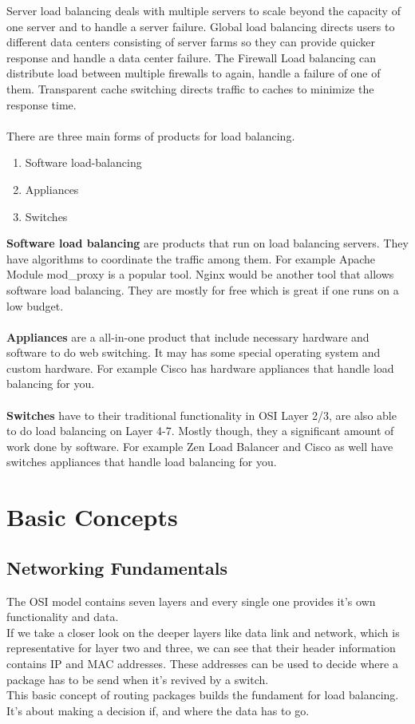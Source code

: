 \documentclass[12p]{article}
\begin{document}
	\newpage 
	Server load balancing deals with multiple servers to scale beyond the capacity of one server and to handle a server failure. Global load balancing directs users to different data centers consisting of server farms so they can provide quicker response and handle a data center failure. The Firewall Load balancing can distribute load between multiple firewalls to again, handle a failure of one of them. Transparent cache switching directs traffic to caches to minimize the response time. \\ \\
	There are three main forms of products for load balancing. 
	\begin{enumerate}
		\item Software load-balancing
		\item Appliances
		\item Switches
	\end{enumerate}
	\textbf{Software load balancing} are products that run on load balancing servers. They have algorithms to coordinate the traffic among them. For example Apache Module mod\_proxy is a popular tool. Nginx would be another tool that allows software load balancing. They are mostly for free which is great if one runs on a low budget.  \\\\ %
	\textbf{Appliances} are a all-in-one product that include necessary hardware and software to do web switching. It may has some special operating system and custom hardware. For example Cisco has hardware appliances that handle load balancing for you. \\\\ %
	\textbf{Switches} have to their traditional functionality in OSI Layer 2/3, are also able to do load balancing on Layer 4-7. Mostly though, they a significant amount of work done by software. For example Zen Load Balancer  and Cisco as well have switches  appliances that handle load balancing for you.
	
	\newpage
	\section{Basic Concepts}
	\subsection{Networking Fundamentals}
	The OSI model contains seven layers and every single one provides it's own functionality and data.\\
	If we take a closer look on the deeper layers like data link and network, which is representative for layer two and three, we can see that their header information contains IP and MAC addresses. These addresses can be used to decide where a package has to be send when it's revived by a switch.\\
	This basic concept of routing packages builds the fundament for load balancing. It's about making a decision if, and where the data has to go. \cite{lb_SFC}
	
\end{document}
